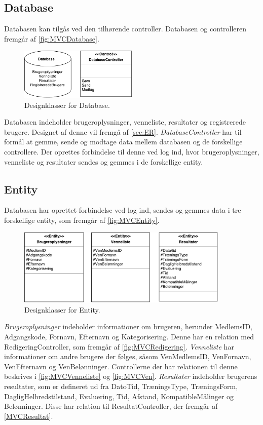 \subsection*{Database}
Databasen kan tilgås ved den tilhørende controller. Databasen og controlleren fremgår af \autoref{fig:MVCDatabase}. 

\begin{figure} [H]
\centering
\includegraphics[width=0.5\textwidth]{figures/MVC/MVCDatabase}
\caption{Designklasser for Database.}
\label{fig:MVCDatabase}
\end{figure}

\noindent
Databasen indeholder brugeroplysninger, venneliste, resultater og registrerede brugere. Designet af denne vil fremgå af \autoref{sec:ER}. \textit{DatabaseController} har til formål at gemme, sende og modtage data mellem databasen og de forskellige controllere. Der oprettes forbindelse til denne ved log ind, hvor brugeroplysninger, venneliste og resultater sendes og gemmes i de forskellige entity. 


\subsection*{Entity}  
Databasen har oprettet forbindelse ved log ind, sendes og gemmes data i tre forskellige entity, som fremgår af \autoref{fig:MVCEntity}. 

\begin{figure} [H]
\centering
\includegraphics[width=0.9\textwidth]{figures/MVC/Entity}
\caption{Designklasser for Entity.}
\label{fig:MVCEntity}
\end{figure}

\noindent
\textit{Brugeroplysninger} indeholder informationer om brugeren, herunder MedlemsID, Adgangskode, Fornavn, Efternavn og Kategorisering. Denne har en relation med RedigeringController, som fremgår af \autoref{fig:MVCRedigering}. 
\textit{Venneliste} har informationer om andre brugere der følges, såsom VenMedlemsID, VenFornavn, VenEfternavn og VenBelønninger. Controllerne der har relationen til denne beskrives i \autoref{fig:MVCVenneliste} og  \autoref{fig:MVCVen}.
\textit{Resultater} indeholder brugerens resultater, som er defineret ud fra DatoTid, TræningsType, TræningsForm, DagligHelbredstilstand, Evaluering, Tid, Afstand, KompatibleMålinger og Belønninger. Disse har relation til ResultatController, der fremgår af  \autoref{MVCResultat}.

